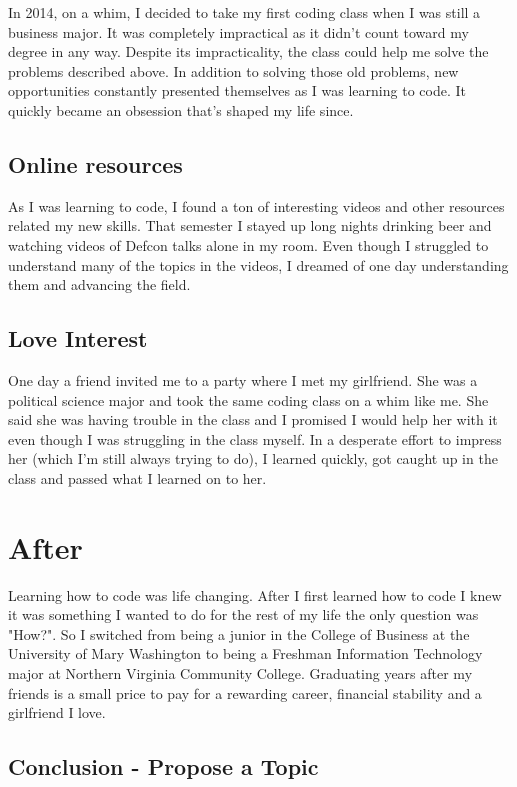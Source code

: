 \documentclass[titlepage]{article}
\begin{document}
In 2014, on a whim, I decided to take my first coding class when I was still a business major. It was completely impractical as it didn't count toward my degree in any way. Despite its impracticality, the class could help me solve the problems described above. In addition to solving those old problems, new opportunities constantly presented themselves as I was learning to code. It quickly became an obsession that's shaped my life since.

\subsection{Online resources}

As I was learning to code, I found a ton of interesting videos and other resources related my new skills. That semester I stayed up long nights drinking beer and watching videos of Defcon talks alone in my room. Even though I struggled to understand many of the topics in the videos, I dreamed of one day understanding them and advancing the field.

\subsection{Love Interest}

One day a friend invited me to a party where I met my girlfriend. She was a political science major and took the same coding class on a whim like me. She said she was having trouble in the class and I promised I would help her with it even though I was struggling in the class myself. In a desperate effort to impress her (which I'm still always trying to do), I learned quickly, got caught up in the class and passed what I learned on to her. 

\section{After}

Learning how to code was life changing. After I first learned how to code I knew it was something I wanted to do for the rest of my life the only question was "How?". So I switched from being a junior in the College of Business at the University of Mary Washington to being a Freshman Information Technology major at Northern Virginia Community College. Graduating years after my friends is a small price to pay for a rewarding career, financial stability and a girlfriend I love. 


\subsection{Conclusion - Propose a Topic}
\end{document}
